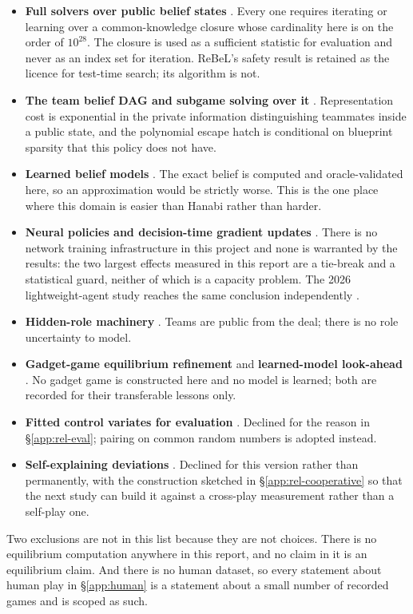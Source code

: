 \begin{itemize}
  \item \textbf{Full solvers over public belief states}
        \cite{moravcik2017deepstack,brown2020rebel,schmid2023sog}. Every one
        requires iterating or learning over a common-knowledge closure whose
        cardinality here is on the order of $10^{28}$. The closure is used as a
        sufficient statistic for evaluation and never as an index set for
        iteration. ReBeL's safety result is retained as the licence for
        test-time search; its algorithm is not.
  \item \textbf{The team belief DAG and subgame solving over it}
        \cite{zhang-tbdag,carminati-tpi,zhang2022teamsubgame}. Representation
        cost is exponential in the private information distinguishing teammates
        inside a public state, and the polynomial escape hatch is conditional on
        blueprint sparsity that this policy does not have.
  \item \textbf{Learned belief models} \cite{hu2021lbs,foerster2019bad}. The
        exact belief is computed and oracle-validated here, so an approximation
        would be strictly worse. This is the one place where this domain is
        easier than Hanabi rather than harder.
  \item \textbf{Neural policies and decision-time gradient updates}
        \cite{fickinger2021rlfinetuning}. There is no network training
        infrastructure in this project and none is warranted by the results:
        the two largest effects measured in this report are a tie-break and a
        statistical guard, neither of which is a capacity problem. The 2026
        lightweight-agent study reaches the same conclusion independently
        \cite{kelidari2026goldstandard}.
  \item \textbf{Hidden-role machinery} \cite{carminati2024hiddenrole}. Teams are
        public from the deal; there is no role uncertainty to model.
  \item \textbf{Gadget-game equilibrium refinement}
        \cite{kubicek2026refinements} and \textbf{learned-model look-ahead}
        \cite{kubicek2025lamir}. No gadget game is constructed here and no model
        is learned; both are recorded for their transferable lessons only.
  \item \textbf{Fitted control variates for evaluation}
        \cite{zinkevich-divat,burch-aivat}. Declined for the reason in
        \S\ref{app:rel-eval}; pairing on common random numbers is adopted
        instead.
  \item \textbf{Self-explaining deviations} \cite{hu2022sed}. Declined for this
        version rather than permanently, with the construction sketched in
        \S\ref{app:rel-cooperative} so that the next study can build it against
        a cross-play measurement rather than a self-play one.
\end{itemize}

Two exclusions are not in this list because they are not choices. There is no
equilibrium computation anywhere in this report, and no claim in it is an
equilibrium claim. And there is no human dataset, so every statement about human
play in \S\ref{app:human} is a statement about a small number of recorded games
and is scoped as such.
